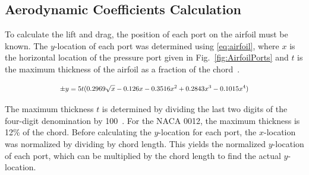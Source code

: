 \documentclass[journal,letterpaper]{IEEEtran}
\begin{document}
\subsection{Aerodynamic Coefficients Calculation}

To calculate the lift and drag, the position of each port on the airfoil must be known.
The $y$-location of each port was determined using \eqref{eq:airfoil}, where $x$ is the horizontal location of the pressure port given in Fig.~\ref{fig:AirfoilPorts} and $t$ is the maximum thickness of the airfoil as a fraction of the chord~\cite{AirfoilEq}.

\begin{equation} \label{eq:airfoil}
    \resizebox{227pt}{!}{$\displaystyle{\pm y = 5t(0.2969\sqrt{x} - 0.126x - 0.3516x^2 + 0.2843x^3 - 0.1015x^4)}$}
\end{equation}

The maximum thickness $t$ is determined by dividing the last two digits of the four-digit denomination by 100~\cite{AirfoilEq}.
For the NACA 0012, the maximum thickness is 12\% of the chord.
Before calculating the $y$-location for each port, the $x$-location was normalized by dividing by chord length.
This yields the normalized $y$-location of each port, which can be multiplied by the chord length to find the actual $y$-location.
\end{document}
